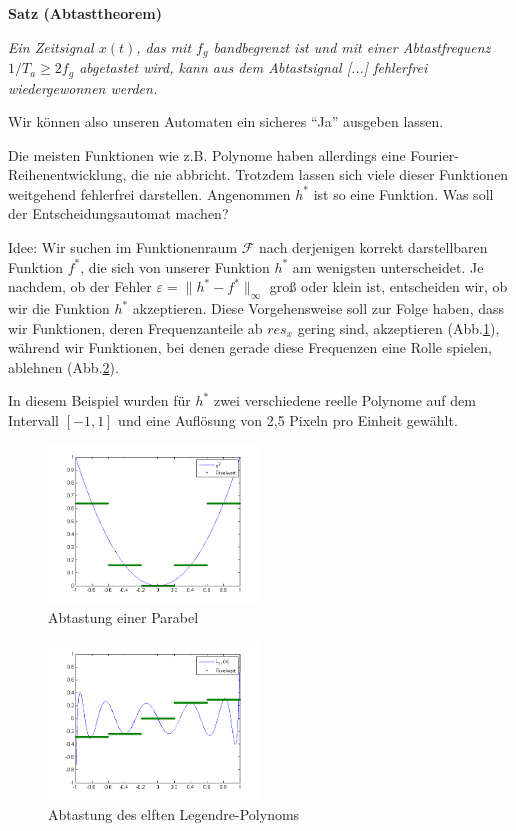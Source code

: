 \documentclass[a4paper]{article}
\begin{document}
\textbf{Satz (Abtasttheorem)} \cite[nach][]{MuellerWichards1999}

\textit{Ein Zeitsignal $x(t)$, das mit $f_g$ bandbegrenzt ist und mit einer Abtastfrequenz $1/T_a \geq 2 f_g$ abgetastet wird, kann aus dem Abtastsignal [...] fehlerfrei wiedergewonnen werden.}

Wir können also unseren Automaten ein sicheres "`Ja"'  ausgeben lassen.

Die meisten Funktionen wie z.B. Polynome haben allerdings eine Fourier-Rei\-henentwicklung, die nie abbricht. Trotzdem lassen sich viele dieser Funktionen weitgehend fehlerfrei darstellen. Angenommen $h^*$ ist so eine Funktion. Was soll der Entscheidungsautomat  machen?

Idee: Wir suchen im Funktionenraum $\mathcal{F}$ nach derjenigen korrekt darstellbaren Funktion $f^*$, die sich von unserer Funktion $h^*$ am wenigsten unterscheidet. Je nachdem, ob der Fehler $\varepsilon=\lVert h^*-f^*\rVert_{\infty}$ groß oder klein ist, entscheiden wir, ob wir die Funktion $h^*$ akzeptieren.
Diese Vorgehensweise soll zur Folge haben, dass wir Funktionen, deren Frequenzanteile ab $res_x$ gering sind, akzeptieren (Abb.\ref{Abb.1}), während wir Funktionen, bei denen gerade diese Frequenzen eine Rolle spielen, ablehnen (Abb.\ref{Abb.2}).

In diesem Beispiel wurden für $h^*$ zwei verschiedene reelle Polynome auf dem Intervall $[-1,1]$ und eine Auflösung von 2,5 Pixeln pro Einheit gewählt.

\begin{figure}[ht]
\centering
\includegraphics[width=0.5\textwidth]{../grafiken/parabelplot.png}
\caption{Abtastung einer Parabel}
\label{Abb.1}
\end{figure}
\begin{figure}[ht]
\centering
\includegraphics[width=0.5\textwidth]{../grafiken/legendre11plot.png}
\caption{Abtastung des elften Legendre-Polynoms}
\label{Abb.2}
\end{figure}
\end{document}
